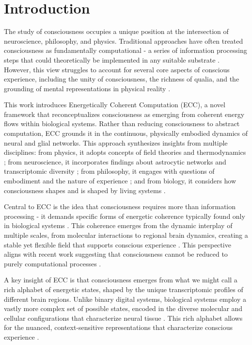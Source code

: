 \section{Introduction}

The study of consciousness occupies a unique position at the intersection of neuroscience, philosophy, and physics. Traditional approaches have often treated consciousness as fundamentally computational - a series of information processing steps that could theoretically be implemented in any suitable substrate \cite{dennett1993consciousness}. However, this view struggles to account for several core aspects of conscious experience, including the unity of consciousness, the richness of qualia, and the grounding of mental representations in physical reality \cite{block1995confusion}.

This work introduces Energetically Coherent Computation (ECC), a novel framework that reconceptualizes consciousness as emerging from coherent energy flows within biological systems. Rather than reducing consciousness to abstract computation, ECC grounds it in the continuous, physically embodied dynamics of neural and glial networks. This approach synthesizes insights from multiple disciplines: from physics, it adopts concepts of field theories and thermodynamics \cite{prigogine2018order}; from neuroscience, it incorporates findings about astrocytic networks and transcriptomic diversity \cite{Giaume2010,Hawrylycz2012}; from philosophy, it engages with questions of embodiment and the nature of experience \cite{varela1991embodied}; and from biology, it considers how consciousness shapes and is shaped by living systems \cite{maturana1991autopoiesis}.

Central to ECC is the idea that consciousness requires more than information processing - it demands specific forms of energetic coherence typically found only in biological systems \cite{margulis2001conscious}. This coherence emerges from the dynamic interplay of multiple scales, from molecular interactions to regional brain dynamics, creating a stable yet flexible field that supports conscious experience \cite{thompson2010mind}. This perspective aligns with recent work suggesting that consciousness cannot be reduced to purely computational processes \cite{seth2024conscious}.

A key insight of ECC is that consciousness emerges from what we might call a rich alphabet of energetic states, shaped by the unique transcriptomic profiles of different brain regions. Unlike binary digital systems, biological systems employ a vastly more complex set of possible states, encoded in the diverse molecular and cellular configurations that characterize neural tissue \cite{levin2019computational}. This rich alphabet allows for the nuanced, context-sensitive representations that characterize conscious experience \cite{seth2021being,juarrero2023context}.

